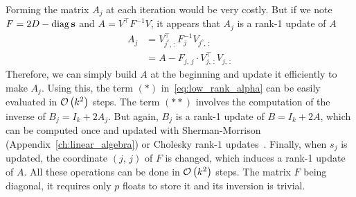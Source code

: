 Forming the matrix $A_j$ at each iteration would be very costly.
But if we note $F = 2D - \operatorname*{diag}\mathbf{s}$ and $A = V^\top F^{-1} V$,
it appears that $A_j$ is a rank-1 update of $A$
\begin{align*}
    A_j &= V_{j^c,\, :}^\top F_j^{-1} V_{j^c,\, :}\\
    &= A - F_{j,\, j} \cdot V_{j,\, :}^\top V_{j,\, :}
\end{align*}
Therefore, we can simply build $A$ at the beginning and update it efficiently to make $A_j$.
Using this, the term $(*)$ in~\ref{eq:low_rank_alpha} can be easily evaluated in $\mathcal{O}\left( k^2 \right)$ steps.
The term $(**)$ involves the computation of the inverse of $B_j = I_k + 2A_j$.
But again, $B_j$ is a rank-1 update of $B = I_k + 2A$,
which can be computed once
and updated with Sherman-Morrison (Appendix~\ref{ch:linear_algebra})
or Cholesky rank-$1$ updates~\citep{cholesky_rank_1}.
Finally, when $s_j$ is updated, the coordinate $(j,\, j)$ of $F$ is changed,
which induces a rank-1 update of $A$.
All these operations can be done in $\mathcal{O}\left( k^2 \right)$ steps.
The matrix $F$ being diagonal,
it requires only $p$ floats to store it and its inversion is trivial.

